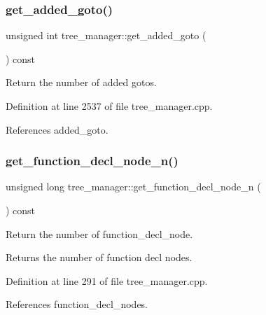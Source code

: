 \subsubsection{\texorpdfstring{get\+\_\+added\+\_\+goto()}{get\_added\_goto()}}
{\footnotesize\ttfamily unsigned int tree\+\_\+manager\+::get\+\_\+added\+\_\+goto (\begin{DoxyParamCaption}{ }\end{DoxyParamCaption}) const}



Return the number of added gotos. 



Definition at line 2537 of file tree\+\_\+manager.\+cpp.



References added\+\_\+goto.

\mbox{\label{classtree__manager_a730bac06420142bd407142fb2bd274a5}} 
\subsubsection{\texorpdfstring{get\+\_\+function\+\_\+decl\+\_\+node\+\_\+n()}{get\_function\_decl\_node\_n()}}
{\footnotesize\ttfamily unsigned long tree\+\_\+manager\+::get\+\_\+function\+\_\+decl\+\_\+node\+\_\+n (\begin{DoxyParamCaption}{ }\end{DoxyParamCaption}) const}



Return the number of function\+\_\+decl\+\_\+node. 

\begin{DoxyReturn}{Returns}
the number of function decl nodes. 
\end{DoxyReturn}


Definition at line 291 of file tree\+\_\+manager.\+cpp.



References function\+\_\+decl\+\_\+nodes.

\mbox{\label{classtree__manager_a5781a4878fd8df312cbff50cbd3837de}} 
